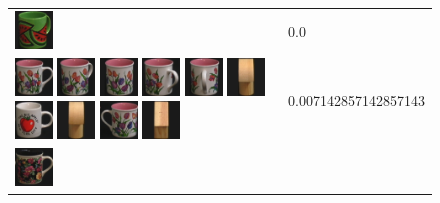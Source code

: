 {\begin{figure}[p]
\begin{tabular}{m{11cm} | m{3cm} |}
\includegraphics[width=1cm]{coil/beeld-33.eps}
& {\scriptsize 0.0}
\\
\includegraphics[width=1cm]{coil/beeld-6.eps}
\includegraphics[width=1cm]{coil/beeld-9.eps}
\includegraphics[width=1cm]{coil/beeld-8.eps}
\includegraphics[width=1cm]{coil/beeld-10.eps}
\includegraphics[width=1cm]{coil/beeld-11.eps}
\includegraphics[width=1cm]{coil/beeld-2.eps}
\includegraphics[width=1cm]{coil/beeld-36.eps}
\includegraphics[width=1cm]{coil/beeld-5.eps}
\includegraphics[width=1cm]{coil/beeld-7.eps}
\includegraphics[width=1cm]{coil/beeld-47.eps}
& {\scriptsize 0.007142857142857143}
\\
\includegraphics[width=1cm]{coil/beeld-60.eps}

\end{tabular}
\end{figure}}
